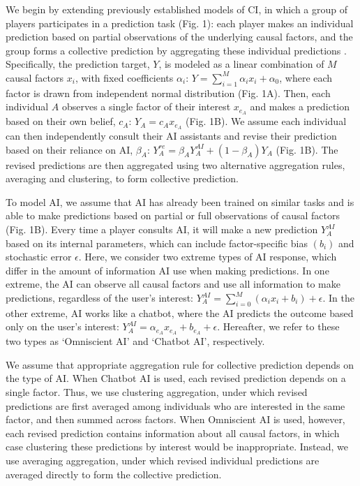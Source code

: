 \documentclass[12pt]{article}
\begin{document}
We begin by extending previously established models of CI, in which a group of players participates in a prediction task (Fig. 1): each player makes an individual prediction based on partial observations of the underlying causal factors, and the group forms a collective prediction by aggregating these individual predictions \citep{hong2012incentives, mann2017optimal,wang2025individual}.
Specifically, the prediction target, $Y$, is modeled as a linear combination of $M$ causal factors $x_i$, with fixed coefficients $\alpha_i$: $Y = \sum_{i = 1}^{M} \alpha_i x_i + \alpha_0$, where each factor is drawn from independent normal distribution (Fig. 1A).
Then, each individual $A$ observes a single factor of their interest $x_{e_A}$ and makes a prediction based on their own belief, $c_A$: $Y_{A} = c_A x_{e_A}$ (Fig. 1B).
We assume each individual can then independently consult their AI assistants and revise their prediction based on their reliance on AI, $\beta_A$: $Y_A^{re} = \beta_A Y_A^{AI} + (1 - \beta_A) Y_A$ (Fig. 1B).
The revised predictions are then aggregated using two alternative aggregation rules, averaging and clustering, to form collective prediction.

To model AI, we assume that AI has already been trained on similar tasks and is able to make predictions based on partial or full observations of causal factors (Fig. 1B).
Every time a player consults AI, it will make a new prediction $Y_A^{AI}$ based on its internal parameters, which can include factor-specific bias $(b_i)$ and stochastic error $\epsilon$.
Here, we consider two extreme types of AI response, which differ in the amount of information AI use when making predictions.
In one extreme, the AI can observe all causal factors and use all information to make predictions, regardless of the user’s interest:
$Y_{A}^{AI} = \sum_{i = 0}^{M}(\alpha_{i}x_{i} + b_{i}) + \epsilon$.
In the other extreme, AI works like a chatbot, where the AI predicts the outcome based only on the user's interest:
$Y_{A}^{AI} = \alpha_{e_A}x_{e_A} + b_{e_{A}} + \epsilon$.
Hereafter, we refer to these two types as `Omniscient AI' and `Chatbot AI', respectively.

We assume that appropriate aggregation rule for collective prediction depends on the type of AI.
When Chatbot AI is used, each revised prediction depends on a single factor.
Thus, we use clustering aggregation, under which revised predictions are first averaged among individuals who are interested in the same factor, and then summed across factors.
When Omniscient AI is used, however, each revised prediction contains information about all causal factors, in which case clustering these predictions by interest would be inappropriate.
Instead, we use averaging aggregation, under which revised individual predictions are averaged directly to form the collective prediction.
\end{document}
